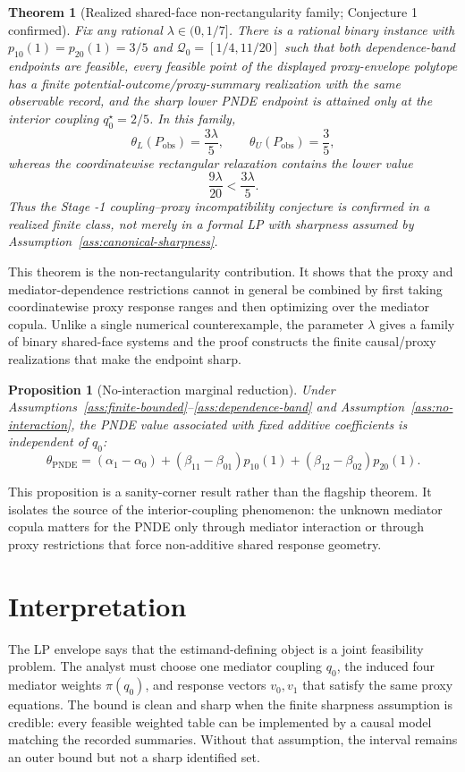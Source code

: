 \documentclass[11pt]{article}
\theoremstyle{definition}
\theoremstyle{plain}
\newtheorem{theorem}{Theorem}
\newtheorem{proposition}{Proposition}
\theoremstyle{remark}
\begin{document}
\begin{theorem}[Realized shared-face non-rectangularity family; Conjecture 1 confirmed]\label{thm:interior-witness}
Fix any rational \(\lambda\in(0,1/7]\).  There is a rational binary instance
with \(p_{10}(1)=p_{20}(1)=3/5\) and
\(\mathcal Q_0=[1/4,11/20]\) such that both dependence-band endpoints are
feasible, every feasible point of the displayed proxy-envelope polytope has a
finite potential-outcome/proxy-summary realization with the same observable
record, and the sharp lower PNDE endpoint is attained only at the interior
coupling \(q_0^\star=2/5\).  In this family,
\[
  \theta_L(P_{\mathrm{obs}})=\frac{3\lambda}{5},\qquad
  \theta_U(P_{\mathrm{obs}})=\frac35,
\]
whereas the coordinatewise rectangular relaxation contains the lower value
\[
  \frac{9\lambda}{20}<\frac{3\lambda}{5}.
\]
Thus the Stage -1 coupling--proxy incompatibility conjecture is confirmed in
a realized finite class, not merely in a formal LP with sharpness assumed by
Assumption~\ref{ass:canonical-sharpness}.
\end{theorem}

This theorem is the non-rectangularity contribution.  It shows that the proxy
and mediator-dependence restrictions cannot in general be combined by first
taking coordinatewise proxy response ranges and then optimizing over the
mediator copula.  Unlike a single numerical counterexample, the parameter
\(\lambda\) gives a family of binary shared-face systems and the proof
constructs the finite causal/proxy realizations that make the endpoint sharp.

\begin{proposition}[No-interaction marginal reduction]\label{prop:additive-reduction}
Under Assumptions~\ref{ass:finite-bounded}--\ref{ass:dependence-band} and
Assumption~\ref{ass:no-interaction}, the PNDE value associated with fixed
additive coefficients is independent of \(q_0\):
\[
  \theta_{\mathrm{PNDE}}
  =
  (\alpha_1-\alpha_0)
  +(\beta_{11}-\beta_{01})p_{10}(1)
  +(\beta_{12}-\beta_{02})p_{20}(1).
\]
\end{proposition}

This proposition is a sanity-corner result rather than the flagship theorem.
It isolates the source of the interior-coupling phenomenon: the unknown
mediator copula matters for the PNDE only through mediator interaction or
through proxy restrictions that force non-additive shared response geometry.

\section{Interpretation}
The LP envelope says that the estimand-defining object is a joint feasibility
problem.  The analyst must choose one mediator coupling \(q_0\), the induced
four mediator weights \(\pi(q_0)\), and response vectors \(v_0,v_1\) that
satisfy the same proxy equations.  The bound is clean and sharp when the
finite sharpness assumption is credible: every feasible weighted table can be
implemented by a causal model matching the recorded summaries.  Without that
assumption, the interval remains an outer bound but not a sharp identified
set.
\end{document}
